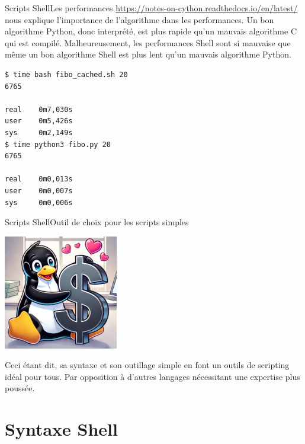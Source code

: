 \documentclass{beamer}
\begin{document}
    \begin{frame}[fragile]{Scripts Shell}{Les performances}
        \url{https://notes-on-cython.readthedocs.io/en/latest/} nous explique l'importance de l'algorithme dans les performances.
        Un bon algorithme Python, donc interprété, est plus rapide qu'un mauvais algorithme C qui est compilé.
        \bigbreak
        Malheureusement, les performances Shell sont si mauvaise que même un bon algorithme Shell est plus lent qu'un mauvais algorithme Python.
        \begin{lstlisting}[language=bash]
$ time bash fibo_cached.sh 20
6765

real    0m7,030s
user    0m5,426s
sys     0m2,149s
$ time python3 fibo.py 20
6765

real    0m0,013s
user    0m0,007s
sys     0m0,006s
        \end{lstlisting}
    \end{frame}

    \begin{frame}{Scripts Shell}{Outil de choix pour les scripts simples}
        \begin{center}
            \includegraphics[width=5cm]{image/pinguin-hugging-shell}
        \end{center}
        Ceci étant dit, sa syntaxe et son outillage simple en font un outils de scripting idéal pour tous.
        Par opposition à d'autres langages nécessitant une expertise plus poussée.
    \end{frame}


    \section{Syntaxe Shell}\label{sec:syntaxe-shell}
\end{document}
